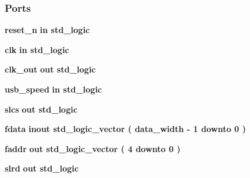 \subsubsection*{Ports}
 \begin{DoxyCompactItemize}
\item 
{\bf reset\+\_\+n}  {\bfseries {\bfseries \textcolor{keywordflow}{in}\textcolor{vhdlchar}{ }}} {\bfseries \textcolor{comment}{std\+\_\+logic}\textcolor{vhdlchar}{ }} 
\item 
{\bf clk}  {\bfseries {\bfseries \textcolor{keywordflow}{in}\textcolor{vhdlchar}{ }}} {\bfseries \textcolor{comment}{std\+\_\+logic}\textcolor{vhdlchar}{ }} 
\item 
{\bf clk\+\_\+out}  {\bfseries {\bfseries \textcolor{keywordflow}{out}\textcolor{vhdlchar}{ }}} {\bfseries \textcolor{comment}{std\+\_\+logic}\textcolor{vhdlchar}{ }} 
\item 
{\bf usb\+\_\+speed}  {\bfseries {\bfseries \textcolor{keywordflow}{in}\textcolor{vhdlchar}{ }}} {\bfseries \textcolor{comment}{std\+\_\+logic}\textcolor{vhdlchar}{ }} 
\item 
{\bf slcs}  {\bfseries {\bfseries \textcolor{keywordflow}{out}\textcolor{vhdlchar}{ }}} {\bfseries \textcolor{comment}{std\+\_\+logic}\textcolor{vhdlchar}{ }} 
\item 
{\bf fdata}  {\bfseries {\bfseries \textcolor{keywordflow}{inout}\textcolor{vhdlchar}{ }}} {\bfseries \textcolor{comment}{std\+\_\+logic\+\_\+vector}\textcolor{vhdlchar}{ }\textcolor{vhdlchar}{(}\textcolor{vhdlchar}{ }\textcolor{vhdlchar}{ }\textcolor{vhdlchar}{ }\textcolor{vhdlchar}{ }{\bfseries {\bf data\+\_\+width}} \textcolor{vhdlchar}{-\/}\textcolor{vhdlchar}{ } \textcolor{vhdldigit}{1} \textcolor{vhdlchar}{ }\textcolor{keywordflow}{downto}\textcolor{vhdlchar}{ }\textcolor{vhdlchar}{ } \textcolor{vhdldigit}{0} \textcolor{vhdlchar}{ }\textcolor{vhdlchar}{)}\textcolor{vhdlchar}{ }} 
\item 
{\bf faddr}  {\bfseries {\bfseries \textcolor{keywordflow}{out}\textcolor{vhdlchar}{ }}} {\bfseries \textcolor{comment}{std\+\_\+logic\+\_\+vector}\textcolor{vhdlchar}{ }\textcolor{vhdlchar}{(}\textcolor{vhdlchar}{ }\textcolor{vhdlchar}{ } \textcolor{vhdldigit}{4} \textcolor{vhdlchar}{ }\textcolor{keywordflow}{downto}\textcolor{vhdlchar}{ }\textcolor{vhdlchar}{ } \textcolor{vhdldigit}{0} \textcolor{vhdlchar}{ }\textcolor{vhdlchar}{)}\textcolor{vhdlchar}{ }} 
\item 
{\bf slrd}  {\bfseries {\bfseries \textcolor{keywordflow}{out}\textcolor{vhdlchar}{ }}} {\bfseries \textcolor{comment}{std\+\_\+logic}\textcolor{vhdlchar}{ }} 

\end{DoxyCompactItemize}
